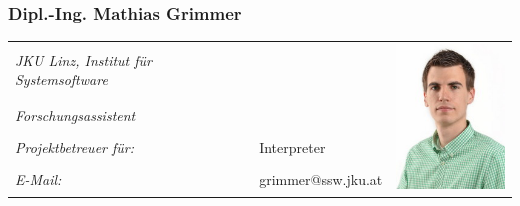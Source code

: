 \pagebreak

\subsubsection*{Dipl.-Ing. Mathias Grimmer}
\renewcommand{\arraystretch}{1.2}
\begin{tabularx}{1\textwidth}{@{} l X l @{}}

\emph{JKU Linz, Institut für Systemsoftware}&&
\multirow{5}{2.5cm}{\includegraphics[width=3cm]{./media/images/project_team/Grimmer.png}
} 
\\
\emph{Forschungsassistent} && \\
\emph{Projektbetreuer für:} & Interpreter & \\
\emph{E-Mail:} & grimmer@ssw.jku.at & \\
\end{tabularx}